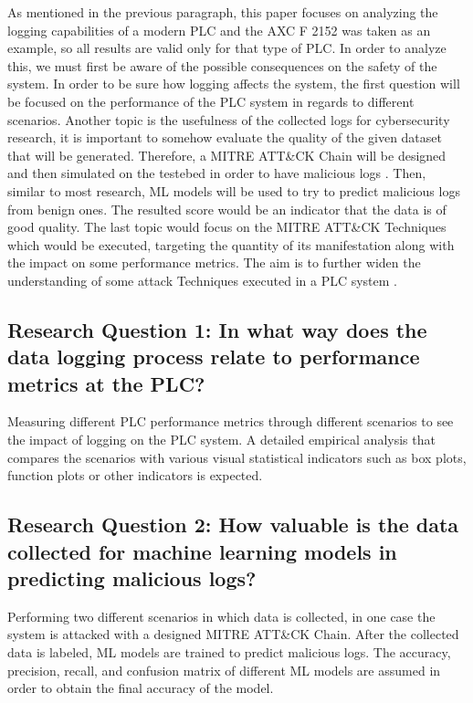 \documentclass[Master,BMR,english]{twbook}
\begin{document}
As mentioned in the previous paragraph, this paper focuses on analyzing the logging capabilities of a modern PLC and the AXC F 2152 was taken as an example, so all results are valid only for that type of PLC. In order to analyze this, we must first be aware of the possible consequences on the safety of the system\cite{phoenix_contact_axc_f_2152}\cite{noauthor_user_2020}. In order to be sure how logging affects the system, the first question will be focused on the performance of the PLC system in regards to different scenarios. Another topic is the usefulness of the collected logs for cybersecurity research, it is important to somehow evaluate the quality of the given dataset that will be generated. Therefore, a MITRE ATT\&CK Chain will be designed and then simulated on the testebed in order to have malicious logs \cite{mitre_attack_chain}. Then, similar to most research, ML models will be used to try to predict malicious logs from benign ones. The resulted score would be an indicator that the data is of good quality. The last topic would focus on the MITRE ATT\&CK Techniques which would be executed, targeting the quantity of its manifestation along with the impact on some performance metrics. The aim is to further widen the understanding of some attack Techniques executed in a PLC system \cite{mitre_attack_ics}. 

\subsection*{Research Question 1: In what way does the data logging process relate to performance metrics at the PLC?}

Measuring different PLC performance metrics through different scenarios to see the impact of logging on the PLC system. A detailed empirical analysis that compares the scenarios with various visual statistical indicators such as box plots, function plots or other indicators is expected.

\subsection*{Research Question 2: How valuable is the data collected for machine learning models in predicting malicious logs?}

Performing two different scenarios in which data is collected, in one case the system is attacked with a designed MITRE ATT\&CK Chain. After the collected data is labeled, ML models are trained to predict malicious logs. The accuracy, precision, recall, and confusion matrix of different ML models are assumed in order to obtain the final accuracy of the model.
\end{document}
